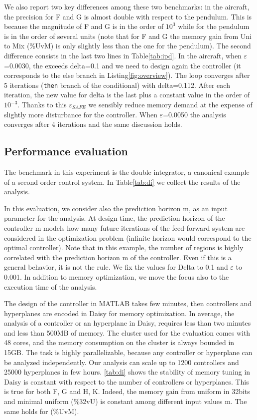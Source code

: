 We also report two key differences among these two benchmarks: in the aircraft, the precision for F and G is almost double with respect to the pendulum. This is because the magnitude of F and G is in the order of $10^{3}$ while for the pendulum is in the order of several units (note that for F and G the memory gain from Uni to Mix (\%UvM) is only slightly less than the one for the pendulum). 
The second difference consists in the last two lines in Table\ref{tab:ipd}.
In the aircraft, when $\varepsilon$=0.0030, the \maxUij exceeds delta=0.1 and we need to design again the controller (it corresponds to the else branch in Listing\ref{fig:overview}). The loop converges after 5 iterations (\texttt{then} branch of the conditional) with delta=0.112. After each iteration, the new value for delta is the last \maxUij\space plus a constant value in the order of $10^{-3}$. Thanks to this $\varepsilon_{SAFE}$ we sensibly reduce memory demand at the expense of slightly more disturbance for the controller. When $\varepsilon$=0.0050 the analysis converges after 4 iterations and the same discussion holds. 


\subsection{Performance evaluation}
The benchmark in this experiment is the double integrator, a canonical example of a second order control system. In Table\ref{tab:di} we collect the results of the analysis.

In this evaluation, we consider also the prediction horizon m, as an input parameter for the analysis. At design time, the prediction horizon of the controller m models how many future iterations of the feed-forward system are considered in the optimization problem (infinite horizon would correspond to the optimal controller). Note that in this example, the number of regions is highly correlated with the prediction horizon m of the controller. Even if this is a general behavior, it is not the rule.
We fix the values for Delta to 0.1 and $\varepsilon$ to 0.001.
In addition to memory optimization, we move the focus also to the execution time of the analysis.

The design of the controller in MATLAB takes few minutes, then controllers and hyperplanes are encoded in Daisy for memory optimization. In average, the analysis of a controller or an hyperplane in Daisy, requires less than two minutes and less than 500MB of memory. The cluster used for the evaluation comes with 48 cores, and the memory consumption on the cluster is always bounded in 15GB. The task is highly parallelizable, because any controller or hyperplane can be analyzed independently.
Our analysis can scale up to 1200 controllers and 25000 hyperplanes in few hours. \autoref{tab:di} shows the stability of memory tuning in Daisy is constant with respect to the number of controllers or hyperplanes. This is true for both F, G and H, K. Indeed, the memory gain from uniform in 32bits and minimal uniform (\%32vU) is constant among different input values m. The same holds for (\%UvM).